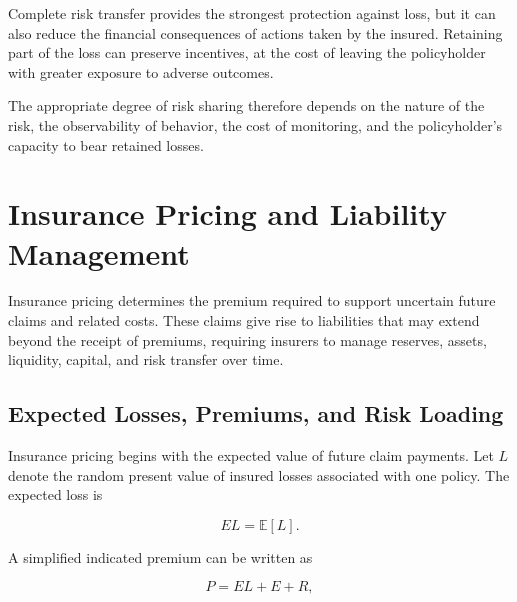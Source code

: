 \begin{tcolorbox}[
enhanced,
breakable,
colback=white,
colframe=FinanceBlue,
boxrule=0.7pt,
sharp corners,
borderline west={2.2pt}{0pt}{FinanceBlue},
title=\textbf{Financial Perspective: More Coverage Can Weaken Incentives},
coltitle=white,
colbacktitle=FinanceBlue,
fonttitle=\bfseries,
before skip=1.2em,
after skip=1.2em
]

Complete risk transfer provides the strongest protection against loss, but it can also reduce the financial consequences of actions taken by the insured. Retaining part of the loss can preserve incentives, at the cost of leaving the policyholder with greater exposure to adverse outcomes.

The appropriate degree of risk sharing therefore depends on the nature of the risk, the observability of behavior, the cost of monitoring, and the policyholder's capacity to bear retained losses.

\end{tcolorbox}


\section{Insurance Pricing and Liability Management}

Insurance pricing determines the premium required to support uncertain future claims and related costs. These claims give rise to liabilities that may extend beyond the receipt of premiums, requiring insurers to manage reserves, assets, liquidity, capital, and risk transfer over time.


\subsection{Expected Losses, Premiums, and Risk Loading}

Insurance pricing begins with the expected value of future claim payments. Let $L$ denote the random present value of insured losses associated with one policy. The expected loss is

\begin{equation}
EL=\mathbb{E}[L].
\label{eq:ch15-expected-loss}
\end{equation}

A simplified indicated premium can be written as

\begin{equation}
P=EL+E+R,
\label{eq:ch15-premium-decomposition}
\end{equation}

